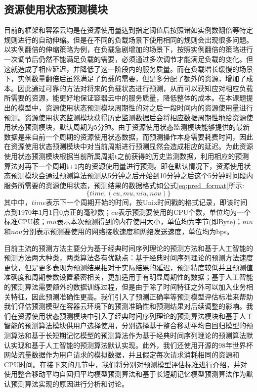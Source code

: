\subsection{资源使用状态预测模块}\label{sec:prediction}
目前的框架和容器云均是在资源使用量达到指定阈值后按照诸如实例数翻倍等特定规则进行的自动伸缩。但是在不同的负载场景下使用相同的规则会出现很多问题。以实例翻倍的伸缩策略为例，在负载急剧增加的场景下，按照实例翻倍的策略进行一次调节后仍然不能满足负载的需要，必须通过多次调节才能满足负载的变化。但这就造成了相应延迟，并降低了这一阶段内的服务质量。而在负载增长缓慢的场景下，实例数量翻倍后虽然满足了负载的需要，但是多分配了额外的资源，增加了成本。因此通过可靠的方法对将来的负载状态进行预测，从而可以获知应对相应负载所需要的资源，能更好地保证容器云中的服务质量，降低整体的成本。在本课题提出的模型中，资源使用状态预测模块周期性的对之后一段时间内的资源使用量进行预测。资源使用状态监测模块获得历史监测数据后会将相应数据周期性地给资源使用状态预测模块，默认周期为5分钟。由于资源使用状态监测模块能够提供的最新数据是来自前一个周期的资源使用状态数据，而预测操作本身需要耗费时间，因此在资源使用状态预测模块中对当前周期进行预测显然会造成相应的延迟。为此资源使用状态预测模块根据当前所属周期t之前获得的历史监测数据，利用相应的预测算法对再下一个周期t+1内的资源使用量进行预测。即在默认情况下，资源使用状态预测模块会通过预测算法预测从5分钟之后开始到10分钟之后这个5分钟时间段内服务所需要的资源使用状态，预测结果的数据格式如公式\ref{eq:pred_format}所示:
\begin{equation}\label{eq:pred_format}
\{time, (cu, mu, niu, nou)\}
\end{equation}
其中中，$time$表示下一个周期开始的时间，按Unix时间戳的格式记录，即该时间点到1970年1月1日0点正的毫秒数；$cu$表示预测要使用的CPU个数，单位均为一个标准CPU核；$mu$表示本次预测得到的内存使用大小，单位均为字节(即Byte)；$niu$和$nou$分别表示预测要使用的网络接收速度和网络发送速度，单位均为bps。

目前主流的预测方法主要分为基于经典时间序列理论的预测方法和基于人工智能的预测方法两大种类，两类算法各有优缺点：基于经典时间序列理论的预测方法速度更快，但是更多表现为预测结果相对于实际结果的延迟，预测精度较低并且预测值准确度和周期参数设置紧密相关，更加适用于有明显周期性的数据；基于人工智能的预测算法需要额外的数据训练过程，但是由于除了时间特征之外可以加入业务相关特征，因此预测准确性更高。我们引入了预测正确率等预测模型评估标准来帮助我们评估预测模型在容器云环境下的预测准确性和预测结果对后续调整的影响。我们在资源使用状态预测模块中引入了经典时间序列理论的预测算法模块和基于人工智能的预测算法模块供用户选择使用，分别选择基于整合移动平均自回归模型的预测算法和基于长短期记忆模型\cite{hochreiter1997long}的预测算法作为基于经典时间序列理论的预测算法默认实现和基于人工智能的预测算法默认实现。此外，我们还使用开源的98年世界杯网站流量数据\cite{arlitt2000workload}作为用户请求的模拟数据，并且假定每次请求消耗相同的资源和CPU时间。在接下来的几节中，我们将分别对预测模型评估标准进行介绍，并对使用整合移动平均自回归平均模型预测算法和基于长短期记忆模型预测算法作为默认预测算法实现的原因进行分析和讨论。

